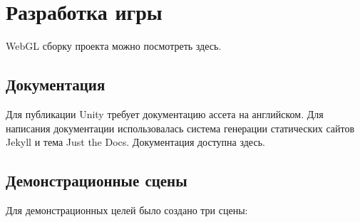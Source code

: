 ﻿\section{Разработка игры}

WebGL сборку проекта можно посмотреть здесь\cite{s9}.

\subsection{Документация}
Для публикации Unity требует документацию ассета на английском. Для написания документации использовалась система генерации статических сайтов Jekyll\cite{s11} и тема Just the Docs\cite{s12}. Документация доступна здесь\cite{s13}.


\subsection{Демонстрационные сцены}
Для демонстрационных целей было создано три сцены:

